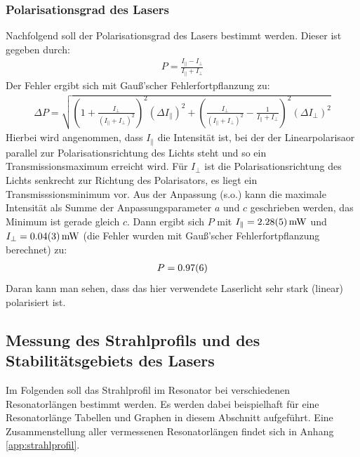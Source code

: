\documentclass[11pt, a4paper]{article}
\numberwithin{equation}{section}
\begin{document}
\subsubsection{Polarisationsgrad des Lasers}
Nachfolgend soll der Polarisationsgrad des Lasers bestimmt werden.
Dieser ist gegeben durch:
\begin{align}
P=\frac{I_{\parallel}-I_{\perp}}{I_{\parallel}+I_{\perp}}
\end{align}
Der Fehler ergibt sich mit Gauß'scher Fehlerfortpflanzung zu:
\begin{align}
\Delta P=\sqrt{\left(1+\frac{I_{\perp}}{(I_{\parallel}+I_{\perp})^2}\right)^2\left(\Delta I_{\parallel}\right)^2 + \left(\frac{I_{\perp}}{(I_{\parallel}+I_{\perp})^2}-\frac{1}{I_{\parallel}+I_{\perp}}\right)^2\left(\Delta I_{\perp}\right)^2}
\end{align}
Hierbei wird angenommen, dass $I_\parallel$ die Intensität ist, bei der der Linearpolarisaor parallel zur Polarisationsrichtung des Lichts steht und so ein Transmissionsmaximum erreicht wird.
Für $I_\perp$ ist die Polarisationsrichtung des Lichts senkrecht zur Richtung des Polarisators, es liegt ein Transmisssionsminimum vor.
Aus der Anpassung (s.o.) kann die maximale Intensität als Summe der Anpassungsparameter $a$ und $c$ geschrieben werden, das Minimum ist gerade gleich $c$. 
Dann ergibt sich $P$ mit $I_\parallel=\SI{2.28+-0.05}{\milli\watt}$ und $I_\perp=\SI{0.04+-0.03}{\milli\watt}$ (die Fehler wurden mit Gauß'scher Fehlerfortpflanzung berechnet) zu:
\begin{align}
P=\num{0.97+-0.06}
\end{align}
Daran kann man sehen, dass das hier verwendete Laserlicht sehr stark (linear) polarisiert ist.

\subsection{Messung des Strahlprofils und des Stabilitätsgebiets des Lasers}
Im Folgenden soll das Strahlprofil im Resonator bei verschiedenen Resonatorlängen bestimmt werden.
Es werden dabei beispielhaft für eine Resonatorlänge Tabellen und Graphen in diesem Abschnitt aufgeführt.
Eine Zusammenstellung aller vermessenen Resonatorlängen findet sich in Anhang \ref{app:strahlprofil}.
\end{document}
